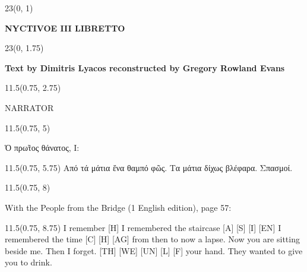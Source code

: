 \documentclass[11pt]{article}
\begin{document}
\begin{textblock}{23}(0, 1)
\begin{center}
\color{myblack}
\huge \textbf{NYCTIVOE III LIBRETTO}
\end{center}
\end{textblock}

\begin{textblock}{23}(0, 1.75)
\begin{center}
\color{myblack}
\large \textbf{Text by Dimitris Lyacos reconstructed by Gregory Rowland Evans}
\end{center}
\end{textblock}

\vspace*{0.25\baselineskip}

\begin{textblock}{11.5}(0.75, 2.75)
\begin{center}
\color{black}
NARRATOR
\end{center}
\end{textblock}

\begin{textblock}{11.5}(0.75, 5)
\begin{center}
\color{mypink}
Ὁ πρ\~ωτος θάνατος, I:
\end{center}
\end{textblock}

\begin{textblock}{11.5}(0.75, 5.75)
\color{black}
Από τά μάτια ἕνα θαμπό φῶς. Τα μάτια δίχως βλέφαρα. Σπασμοί. 
\rightskip\leftskip
\end{textblock}


\begin{textblock}{11.5}(0.75, 8)
\begin{center}
\color{mypink}
With the People from the Bridge (1 English edition), page 57:
\end{center}
\end{textblock}

\begin{textblock}{11.5}(0.75, 8.75)
\color{black}
I remember [H] I remembered the staircase [A] [S] [I] [EN] I remembered the time [C] [H] [AG] from then to now a lapse. Now you are sitting beside me. Then I forget. [TH] [WE] [UN] [L] [F] your hand. They wanted to give you to drink.
\rightskip\leftskip
\end{textblock}
\end{document}
